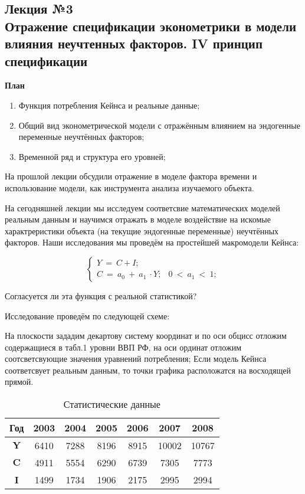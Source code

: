 \documentclass[12pt,a4paper]{article}
\author{Аверьянов Тимофей, Корякин Алексей}
\begin{document}
\begin{center}
\section*{Лекция №3 \\
Отражение спецификации эконометрики в модели влияния неучтенных факторов. IV принцип спецификации}
\textbf{План}
\end{center}

\begin{enumerate}
\item Функция потребления Кейнса и реальные данные;
\item Общий вид эконометрической модели с отражённым влиянием на эндогенные переменные неучтённых факторов;
\item Временной ряд и структура его уровней;
\end{enumerate}

	На прошлой лекции обсудили отражение в моделе фактора времени и использование модели, как инструмента анализа изучаемого объекта.

	На сегодняшней лекции мы исследуем соответсвие математических моделей реальным данным и научимся отражать в моделе воздействие на искомые характреристики объекта (на текущие эндогенные переменные) неучтённых факторов. Наши исследования мы проведём на простейшей макромодели Кейнса:

\begin{equation}
\begin{cases}
Y\ =\ C+I; & \\
C\ =\ a_{0} \ +\ a_{1} \ \cdot Y; & 0\ < \ a_{1} \ < \ 1;
\end{cases}
\end{equation}

	Согласуется ли эта функция с реальной статистикой?

	Исследование проведём по следующей схеме:

На плоскости зададим декартову систему координат и по оси обцисс отложим содержащиеся в табл.1 уровни ВВП РФ, на оси ординат отложим соотсветсвующие значения уравнений потребления; Если модель Кейнса соответсвует реальным данным, то точки графика расположатся на восходящей прямой.


\begin{table}[!h]
\centering
\begin{tabular}{|c|c|c|c|c|c|c|}
\hline
 \textbf{Год} & \textbf{2003} & \textbf{2004} & \textbf{2005} & \textbf{2006} & \textbf{2007} & \textbf{2008} \\
\hline
$\displaystyle \textbf{Y}$ & 6410 & 7288 & 8196 & 8915 & 10002 & 10767 \\
\hline
$\displaystyle \textbf{C}$ & 4911 & 5554 & 6290 & 6739 & 7305 & 7773 \\
\hline
$\displaystyle \textbf{I}$ & 1499 & 1734 & 1906 & 2175 & 2995 & 2994 \\
 \hline
\end{tabular}
\caption{Статистические данные}
\end{table}
\end{document}
